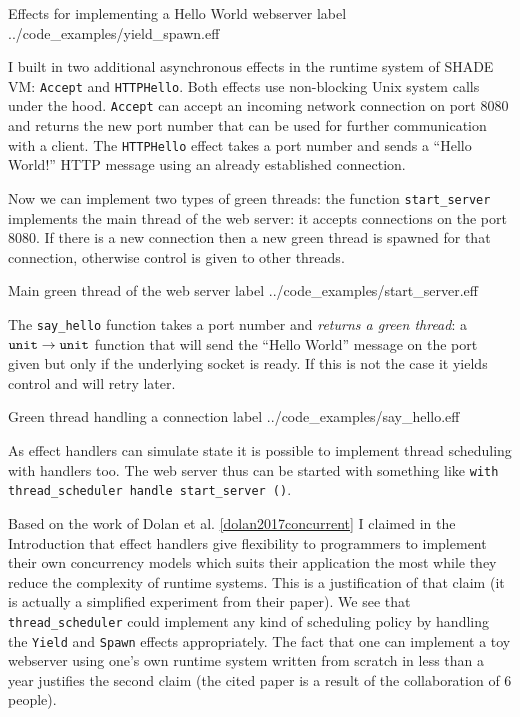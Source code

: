 \documentclass[class=article, crop=false]{standalone}
\begin{document}
{Effects for implementing a Hello World webserver}
{label}
{../code_examples/yield_spawn.eff}

I built in two additional asynchronous effects in the runtime system of
SHADE VM: \verb|Accept| and \verb|HTTPHello|.
Both effects use non-blocking Unix system calls under the hood.
\verb|Accept| can accept an incoming network connection on port 8080 and returns
the new port number that can be used for further communication with a client.
The \verb|HTTPHello| effect takes a port number and sends a ``Hello World!''
HTTP message using an already established connection.

Now we can implement two types of green threads: the function
\lstinline|start_server| implements the main thread of the web server: it
accepts connections on the port 8080. If there is a new connection then a new
green thread is spawned for that connection, otherwise control is given to other
threads.

{Main green thread of the web server}
{label}
{../code_examples/start_server.eff}

The \lstinline{say_hello} function takes a port number and
\emph{returns a green thread}: a $\mathtt{unit} \to \mathtt{unit}$ function that will
send the ``Hello World'' message on the port given but only if the underlying
socket is ready. If this is not the case it yields control and will retry later.

{Green thread handling a connection}
{label}
{../code_examples/say_hello.eff}

As effect handlers can simulate state it is possible to implement thread
scheduling with handlers too. The web server thus can be started with something
like \lstinline{with thread_scheduler handle start_server ()}.

Based on the work of Dolan et al. \autoref{dolan2017concurrent} I claimed in
the Introduction that effect handlers give flexibility to programmers to
implement their own concurrency models which suits their application the most
while they reduce the complexity of runtime systems. This is a justification of
that claim (it is actually a simplified experiment from their paper). We see
that \lstinline|thread_scheduler| could implement any kind of scheduling policy by
handling the \lstinline|Yield| and \lstinline|Spawn| effects appropriately. The fact that
one can implement a toy webserver using one's own runtime system written from
scratch in less than a year justifies the second claim (the cited paper is a
result of the collaboration of 6 people).
\end{document}
